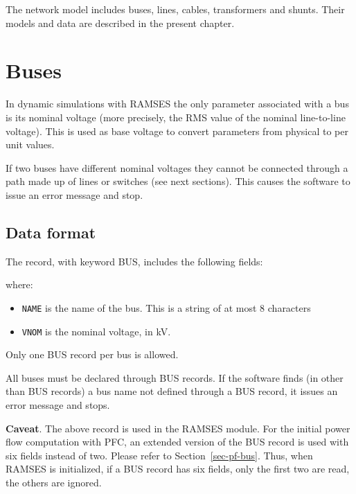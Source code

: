 The network model includes buses, lines, cables, transformers and shunts. Their models and data are described in the present chapter.

\section{Buses}\label{sec-netw-buses}

In dynamic simulations with RAMSES the only parameter associated with a bus is its nominal voltage (more precisely, the RMS value of the nominal line-to-line voltage). This is used as base voltage to convert parameters from physical to per unit values.

If two buses have different nominal voltages they cannot be connected through a path made up of lines or switches (see next sections). This causes the software to issue an error message and stop.


\subsection{Data format}

The record, with keyword BUS, includes the following fields:

\hspace*{5ex}{\tt BUS NAME VNOM ;}

where:
\begin{itemize}
\item {\tt NAME} is the name of the bus. This is a string of at most 8 characters
\item {\tt VNOM} is the nominal voltage, in kV.
\end{itemize}

Only one BUS record per bus is allowed.

All buses must be declared through BUS records. If the software finds (in other than BUS records) a bus name not defined through a BUS record, it issues an error message and stops.

{\bf \large Caveat}. The above record is used in the RAMSES module. For the initial power flow computation with PFC, an extended version of the BUS record is used with six fields instead of two. Please refer to Section~\ref{sec-pf-bus}. Thus, when RAMSES is initialized, if a BUS record has six fields, only the first two are read, the others are ignored.

